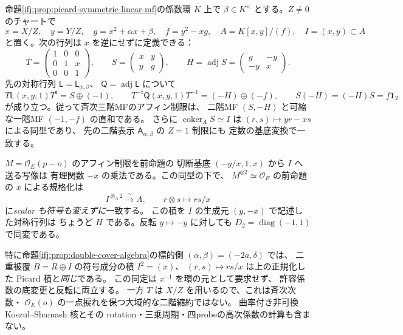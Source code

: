 \begin{proposition}
\label{ifj:prop:picard-affine-bridge}
命題\ref{ifj:prop:picard-symmetric-linear-mf}の係数環 $K$ 上で
$\beta\in K^\times$ とする。$Z\ne0$ のチャートで
\[
 x=X/Z,\quad y=Y/Z,\quad
 g=x^2+\alpha x+\beta,\quad f=y^2-xg,\quad
 A=K[x,y]/(f),\quad I=(x,y)\subset A
\]
と置く。次の行列は $x$ を逆にせずに定義できる：
\[
 T=\begin{pmatrix}1&0&0\\0&1&x\\0&0&1\end{pmatrix},\qquad
 S=\begin{pmatrix}x&y\\y&g\end{pmatrix},\qquad
 H=\operatorname{adj}S=\begin{pmatrix}g&-y\\-y&x\end{pmatrix}.
\]
先の対称行列 $\mathsf L=\mathsf L_{\alpha,\beta}$、
$\mathsf Q=\operatorname{adj}\mathsf L$ について
\begin{equation}\label{ifj:eq:picard-affine-bridge}
 T\mathsf L(x,y,1)T^{\mathsf t}=S\oplus(-1),\qquad
 T^{-\mathsf t}\mathsf Q(x,y,1)T^{-1}=(-H)\oplus(-f),
 \qquad S(-H)=(-H)S=f\mathbf1_2
\end{equation}
が成り立つ。従って斉次三階MFのアフィン制限は、
二階MF $(S,-H)$ と可縮な一階MF $(-1,-f)$ の直和である。
さらに $\operatorname{coker}_A S\simeq I$ は
$(r,s)\mapsto yr-xs$ による同型であり、
先の二階表示 $\mathsf A_{\alpha,\beta}$ の $Z=1$ 制限にも
定数の基底変換で一致する。

$M=\mathcal O_E(p-o)$ のアフィン制限を前命題の
切断基底 $(-y/x,1,x)$ から $I$ へ送る写像は
有理関数 $-x$ の乗法である。この同型の下で、
$M^{\otimes2}\simeq\mathcal O_E$ の前命題の
$x$ による規格化は
\begin{equation}\label{ifj:eq:picard-affine-square}
 I^{\otimes_A2}\xrightarrow{\ \sim\ }A,
 \qquad r\otimes s\longmapsto rs/x
\end{equation}
に\emph{scalar も符号も変えずに}一致する。
この積を $I$ の生成元 $(y,-x)$ で記述した対称行列は
ちょうど $H$ である。反転 $y\mapsto-y$ に対しても
$D_2=\operatorname{diag}(-1,1)$ で同変である。

特に命題\ref{ifj:prop:double-cover-algebra}の標的側
$(\alpha,\beta)=(-2a,\delta)$ では、
二重被覆 $B=R\oplus I$ の符号成分の積 $I^2=(x)$、
$(r,s)\mapsto rs/x$ は上の正規化した Picard 積と\emph{同じ}である。
この同定は $x^{-1}$ を環の元として要求せず、
許容係数の底変更と反転に両立する。
一方 $T$ は $X/Z$ を用いるので、これは斉次次数・
$\mathcal O_E(o)$ の一点捩れを保つ大域的な二階縮約ではない。
曲率付き非可換 Koszul--Shamash 核とその
rotation・三乗周期・四probeの高次係数の計算も含まない。
\end{proposition}

